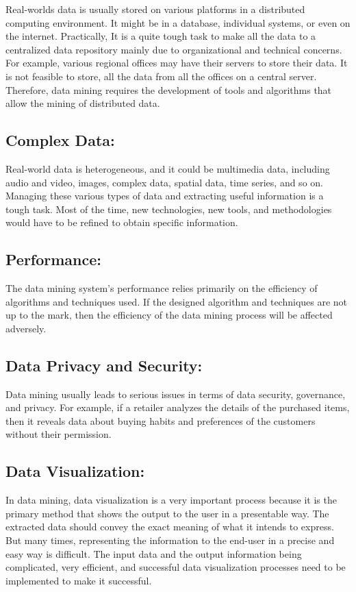 \documentclass[a4paper,10pt]{article}
\begin{document}
Real-worlds data is usually stored on various platforms in a distributed computing environment. It might be in a database, individual systems, or even on the internet. Practically, It is a quite tough task to make all the data to a centralized data repository mainly due to organizational and technical concerns. For example, various regional offices may have their servers to store their data. It is not feasible to store, all the data from all the offices on a central server. Therefore, data mining requires the development of tools and algorithms that allow the mining of distributed data.

\subsection{Complex Data:}

Real-world data is heterogeneous, and it could be multimedia data, including audio and video, images, complex data, spatial data, time series, and so on. Managing these various types of data and extracting useful information is a tough task. Most of the time, new technologies, new tools, and methodologies would have to be refined to obtain specific information.

\subsection{Performance:}

The data mining system's performance relies primarily on the efficiency of algorithms and techniques used. If the designed algorithm and techniques are not up to the mark, then the efficiency of the data mining process will be affected adversely.

\subsection{Data Privacy and Security:}

Data mining usually leads to serious issues in terms of data security, governance, and privacy. For example, if a retailer analyzes the details of the purchased items, then it reveals data about buying habits and preferences of the customers without their permission.

\subsection{Data Visualization:}

In data mining, data visualization is a very important process because it is the primary method that shows the output to the user in a presentable way. The extracted data should convey the exact meaning of what it intends to express. But many times, representing the information to the end-user in a precise and easy way is difficult. The input data and the output information being complicated, very efficient, and successful data visualization processes need to be implemented to make it successful.
\end{document}
